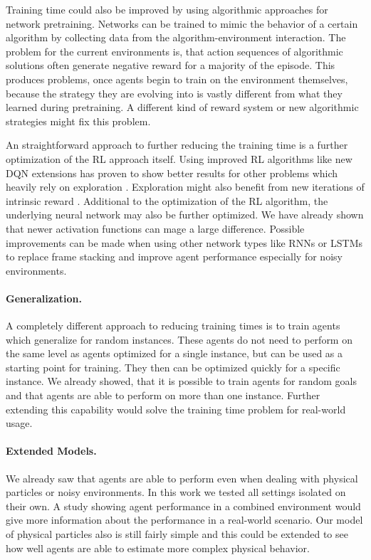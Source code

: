 Training time could also be improved by using algorithmic approaches for network pretraining. Networks can be trained to mimic the behavior of a certain algorithm by collecting data from the algorithm-environment interaction. The problem for the current environments is, that action sequences of algorithmic solutions often generate negative reward for a majority of the episode. This produces problems, once agents begin to train on the environment themselves, because the strategy they are evolving into is vastly different from what they learned during pretraining. A different kind of reward system or new algorithmic strategies might fix this problem.

An straightforward approach to further reducing the training time is a further optimization of the RL approach itself. Using improved RL algorithms like new DQN extensions has proven to show better results for other problems which heavily rely on exploration \cite{badia2020agent57}. Exploration might also benefit from new iterations of intrinsic reward \cite{badia2020never}. Additional to the optimization of the RL algorithm, the underlying neural network may also be further optimized. We have already shown that newer activation functions can mage a large difference. Possible improvements can be made when using other network types like RNNs or LSTMs to replace frame stacking and improve agent performance especially for noisy environments.

\paragraph{Generalization.}
A completely different approach to reducing training times is to train agents which generalize for random instances. These agents do not need to perform on the same level as agents optimized for a single instance, but can be used as a starting point for training. They then can be optimized quickly for a specific instance. We already showed, that it is possible to train agents for random goals and that agents are able to perform on more than one instance. Further extending this capability would solve the training time problem for real-world usage.

\paragraph{Extended Models.}
We already saw that agents are able to perform even when dealing with physical particles or noisy environments. In this work we tested all settings isolated on their own. A study showing agent performance in a combined environment would give more information about the performance in a real-world scenario. Our model of physical particles also is still fairly simple and this could be extended to see how well agents are able to estimate more complex physical behavior.

